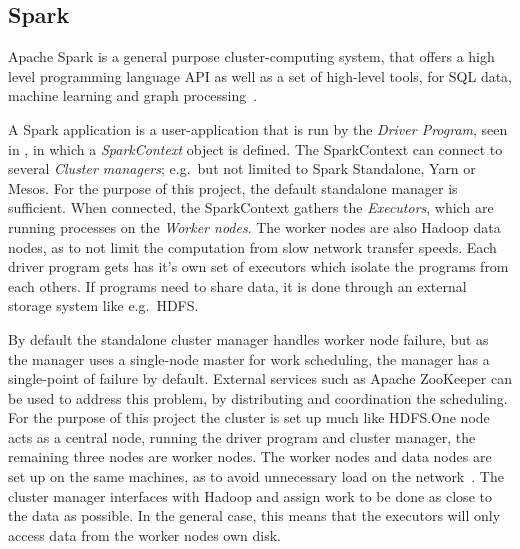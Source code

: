\subsection{Spark}\label{sec:spark}
Apache Spark is a general purpose cluster-computing system, that offers a high level programming language API as well as a set of high-level tools, for SQL data, machine learning and graph processing~\cite{sparkintro}.

A Spark application is a user-application that is run by the \emph{Driver Program}, seen in , in which a \emph{SparkContext} object is defined. The SparkContext can connect to several \emph{Cluster managers}; e.g.\ but not limited to Spark Standalone, Yarn or Mesos. For the purpose of this project, the default standalone manager is sufficient. When connected, the SparkContext gathers the \emph{Executors}, which are running processes on the \emph{Worker nodes}. The worker nodes are also Hadoop data nodes, as to not limit the computation from slow network transfer speeds. Each driver program gets has it's own set of executors which isolate the programs from each others. If programs need to share data, it is done through an external storage system like e.g.\ HDFS.\@

By default the standalone cluster manager handles worker node failure, but as the manager uses a single-node master for work scheduling, the manager has a single-point of failure by default. External services such as Apache ZooKeeper can be used to address this problem, by distributing and coordination the scheduling. For the purpose of this project the cluster is set up much like HDFS.\@ One node acts as a central node, running the driver program and cluster manager, the remaining three nodes are worker nodes. The worker nodes and data nodes are set up on the same machines, as to avoid unnecessary load on the network~\cite{sparkcluster}. The cluster manager interfaces with Hadoop and assign work to be done as close to the data as possible. In the general case, this means that the executors will only access data from the worker nodes own disk. %

